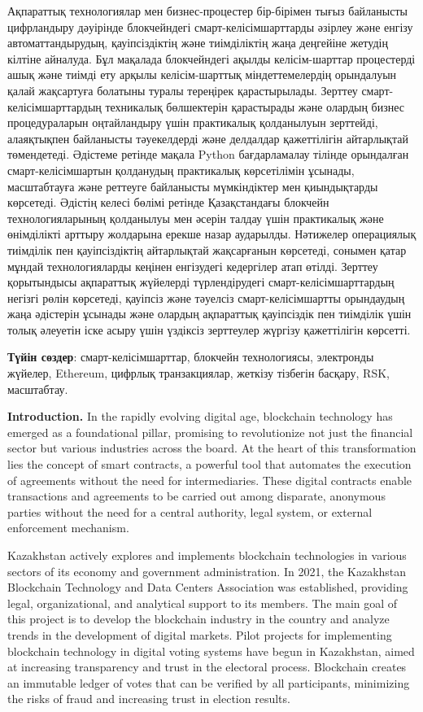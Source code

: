 Ақпараттық технологиялар мен бизнес-процестер бір-бірімен тығыз
байланысты цифрландыру дәуірінде блокчейндегі смарт-келісімшарттарды
әзірлеу және енгізу автоматтандырудың, қауіпсіздіктің және тиімділіктің
жаңа деңгейіне жетудің кілтіне айналуда. Бұл мақалада блокчейндегі
ақылды келісім-шарттар процестерді ашық және тиімді ету арқылы
келісім-шарттық міндеттемелердің орындалуын қалай жақсартуға болатыны
туралы тереңірек қарастырылады. Зерттеу смарт-келісімшарттардың
техникалық бөлшектерін қарастырады және олардың бизнес процедураларын
оңтайландыру үшін практикалық қолданылуын зерттейді, алаяқтықпен
байланысты тәуекелдерді және делдалдар қажеттілігін айтарлықтай
төмендетеді. Әдістеме ретінде мақала Python бағдарламалау тілінде
орындалған смарт-келісімшартын қолданудың практикалық көрсетілімін
ұсынады, масштабтауға және реттеуге байланысты мүмкіндіктер мен
қиындықтарды көрсетеді. Әдістің келесі бөлімі ретінде Қазақстандағы
блокчейн технологияларының қолданылуы мен әсерін талдау үшін практикалық
және өнімділікті арттыру жолдарына ерекше назар аударылды. Нәтижелер
операциялық тиімділік пен қауіпсіздіктің айтарлықтай жақсарғанын
көрсетеді, сонымен қатар мұндай технологияларды кеңінен енгізудегі
кедергілер атап өтілді. Зерттеу қорытындысы ақпараттық жүйелерді
түрлендірудегі смарт-келісімшарттардың негізгі рөлін көрсетеді, қауіпсіз
және тәуелсіз смарт-келісімшартты орындаудың жаңа әдістерін ұсынады және
олардың ақпараттық қауіпсіздік пен тиімділік үшін толық әлеуетін іске
асыру үшін үздіксіз зерттеулер жүргізу қажеттілігін көрсетті.

\textbf{Түйін сөздер}: смарт-келісімшарттар, блокчейн технологиясы,
электронды жүйелер, Ethereum, цифрлық транзакциялар, жеткізу тізбегін
басқару, RSK, масштабтау.

\textbf{Introduction.} In the rapidly evolving digital age, blockchain
technology has emerged as a foundational pillar, promising to
revolutionize not just the financial sector but various industries
across the board. At the heart of this transformation lies the concept
of smart contracts, a powerful tool that automates the execution of
agreements without the need for intermediaries. These digital contracts
enable transactions and agreements to be carried out among disparate,
anonymous parties without the need for a central authority, legal
system, or external enforcement mechanism.

Kazakhstan actively explores and implements blockchain technologies in
various sectors of its economy and government administration. In 2021,
the Kazakhstan Blockchain Technology and Data Centers Association was
established, providing legal, organizational, and analytical support to
its members. The main goal of this project is to develop the blockchain
industry in the country and analyze trends in the development of digital
markets. Pilot projects for implementing blockchain technology in
digital voting systems have begun in Kazakhstan, aimed at increasing
transparency and trust in the electoral process. Blockchain creates an
immutable ledger of votes that can be verified by all participants,
minimizing the risks of fraud and increasing trust in election results.

